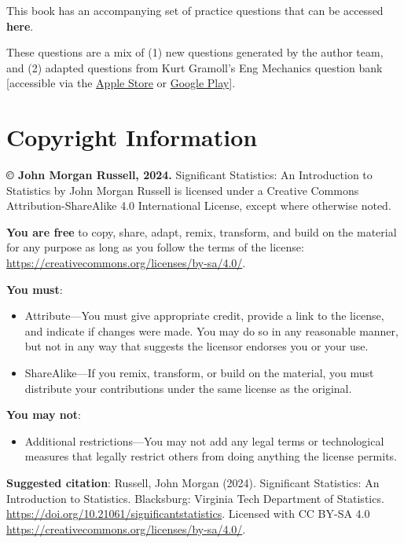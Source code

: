 \documentclass[
  letterpaper,
  DIV=11,
  numbers=noendperiod]{scrreprt}
\providecommand{\tightlist}{%
  \setlength{\itemsep}{0pt}\setlength{\parskip}{0pt}}\usepackage{longtable,booktabs,array}
\begin{document}
This book has an accompanying set of practice questions that can be
accessed \textbf{here}.

These questions are a mix of (1) new questions generated by the author
team, and (2) adapted questions from Kurt Gramoll's Eng Mechanics
question bank {[}accessible via the
\href{https://apps.apple.com/us/app/eng-mechanics/id1526030024}{Apple
Store} or
\href{https://play.google.com/store/apps/details?id=air.com.gramago.engProbME&pli=1}{Google
Play}{]}.

\section*{Copyright Information}\label{copyright-information}


\textbf{© John Morgan Russell, 2024.} Significant Statistics: An
Introduction to Statistics by John Morgan Russell is licensed under a
Creative Commons Attribution-ShareAlike 4.0 International License,
except where otherwise noted.

\textbf{You are free} to copy, share, adapt, remix, transform, and build
on the material for any purpose as long as you follow the terms of the
license: \url{https://creativecommons.org/licenses/by-sa/4.0/}.

\textbf{You must}:

\begin{itemize}
\item
  Attribute---You must give appropriate credit, provide a link to the
  license, and indicate if changes were made. You may do so in any
  reasonable manner, but not in any way that suggests the licensor
  endorses you or your use.
\item
  ShareAlike---If you remix, transform, or build on the material, you
  must distribute your contributions under the same license as the
  original.
\end{itemize}

\textbf{You may not}:

\begin{itemize}
\tightlist
\item
  Additional restrictions---You may not add any legal terms or
  technological measures that legally restrict others from doing
  anything the license permits.
\end{itemize}

\textbf{Suggested citation}: Russell, John Morgan (2024). Significant
Statistics: An Introduction to Statistics. Blacksburg: Virginia Tech
Department of Statistics.
\url{https://doi.org/10.21061/significantstatistics}. Licensed with CC
BY-SA 4.0 \url{https://creativecommons.org/licenses/by-sa/4.0/}.
\end{document}
